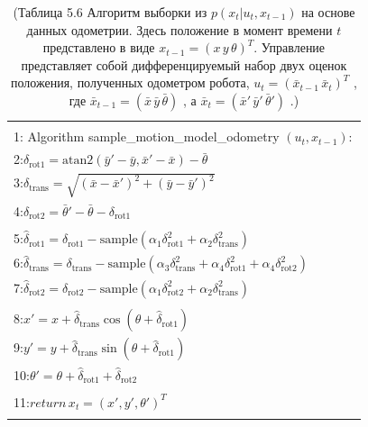 \documentclass[10pt,a4paper]{article}
\begin{document}
\begin{table}[H]
\begin{center}
\begin{tabular}{|l|}
\hline
{}\\
1: \hspace{3mm} Algorithm sample\_motion\_model\_odometry $(u_t,x_{t-1}):$ \\
2:\hspace{7mm}$\delta_{\text{rot}1}=\text{atan}2(\bar{y}'-\bar{y},\bar{x}'-\bar{x})-\bar{\theta}$\\
3:\hspace{7mm}$\delta_{\text{trans}}=\sqrt{(\bar{x}-\bar{x}')^2+(\bar{y}-\bar{y}')^2}$\\
4:\hspace{7mm}$\delta_{\text{rot}2}=\bar{\theta}'-\bar{\theta}-\delta_{\text{rot}1}$\\
{}\\
5:\hspace{7mm}$\hat{\delta}_{\text{rot}1}=\delta_{\text{rot}1}-\text{sample}(\alpha_1\delta_{\text{rot}1}^2+\alpha_2\delta_{\text{trans}}^2)$\\
6:\hspace{7mm}$\hat{\delta}_{\text{trans}}=\delta_{\text{trans}}-\text{sample}(\alpha_3\delta_{\text{trans}}^2+\alpha_4\delta_{\text{rot}1}^2+\alpha_4\delta_{\text{rot}2}^2)$\\
7:\hspace{7mm}$\hat{\delta}_{\text{rot}2}=\delta_{\text{rot}2}-\text{sample}(\alpha_1\delta_{\text{rot}2}^2+\alpha_2\delta_{\text{trans}}^2)$\\
{}\\
8:\hspace{7mm}$x'=x+\hat{\delta}_{\text{trans}}\cos(\theta+\hat{\delta}_{\text{rot}1})$\\
9:\hspace{7mm}$y'=y+\hat{\delta}_{\text{trans}}\sin(\theta+\hat{\delta}_{\text{rot}1})$\\
10:\hspace{5mm}$\theta'=\theta+\hat{\delta}_{\text{rot}1}+\hat{\delta}_{\text{rot}2}$\\
{}\\
11:\hspace{5mm}$\textit{return}\,x_t=(x',y',\theta')^T$\\
{}\\
\hline
\end{tabular}
\caption{(Таблица 5.6 Алгоритм выборки из $p(x_t | u_t, x_{t-1})$ на основе данных одометрии. Здесь положение в момент времени $t$ представлено в виде $x_{t-1} = (x\,y\,\theta)^T$. Управление представляет собой дифференцируемый набор двух оценок положения, полученных одометром робота, $u_t = (\bar{x}_{t-1}\,\bar{x}_t)^T$ , где $\bar{x}_{t-1}=(\bar{x}\,\bar{y}\,\bar{\theta})$ , а $\bar{x}_t=(\bar{x}'\,\bar{y}'\,\bar{\theta}')$ .)}
\end{center}
\end{table}
\end{document}
